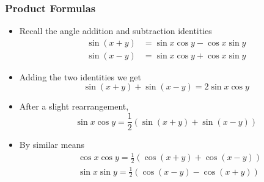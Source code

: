 \documentclass[serif,ignorenonframetext]{beamer}
\begin{document}
\begin{frame}
  \frametitle{Product Formulas}
  \begin{itemize}[<+->]
  \item Recall the angle addition and subtraction identities
    \begin{align*}
      \sin(x+y) &= \sin x \cos y - \cos x \sin y \\
      \sin(x-y) &= \sin x \cos y + \cos x \sin y
    \end{align*}
  \item Adding the two identities we get
    \begin{equation*}
      \sin (x+y) + \sin(x-y) = 2\sin x \cos y
    \end{equation*}
  \item After a slight rearrangement,
    \begin{equation*}
      \mbox{$\sin x \cos y = \frac{1}{2} \left( \sin(x+y) + \sin(x-y) \right)$}
    \end{equation*}
  \item By similar means
    \begin{align*}
      &\mbox{$\cos x \cos y = \frac{1}{2} \left( \cos(x+y)+ \cos(x-y) \right)$}
      \\
      &\mbox{$\sin x \sin y = \frac{1}{2} \left( \cos(x-y)-\cos(x+y) \right)$}
    \end{align*}
  \end{itemize}
\end{frame}
\end{document}
